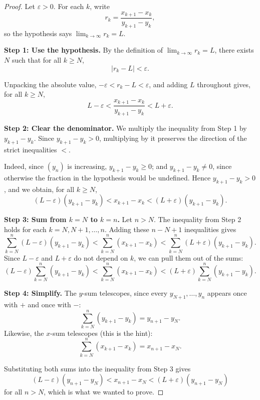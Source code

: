 \documentclass[11pt]{article}
\begin{document}
\begin{proof}


Let $\varepsilon>0$. For each $k$, write
\[
  r_k = \frac{x_{k+1}-x_k}{y_{k+1}-y_k},
\]
so the hypothesis says $\lim_{k\to\infty} r_k = L$.

\textbf{Step 1: Use the hypothesis.}
By the definition of $\lim_{k\to\infty} r_k = L$, there exists $N$ such that
for all $k \ge N$,
\[
  |r_k - L| < \varepsilon .
\]

Unpacking the absolute value, $-\varepsilon < r_k - L < \varepsilon$, and
adding $L$ throughout gives, for all $k\ge N$,
\[
  L - \varepsilon < \frac{x_{k+1}-x_k}{y_{k+1}-y_k} < L + \varepsilon .
\]

\textbf{Step 2: Clear the denominator.}
We multiply the inequality from Step 1 by $y_{k+1}-y_k$. Since
$y_{k+1}-y_k > 0$, multiplying by it preserves the direction of the strict
inequalities $<$.

Indeed, since $(y_n)$ is increasing, $y_{k+1}-y_k \ge 0$; and
$y_{k+1}-y_k \ne 0$, since otherwise the fraction in the hypothesis would be
undefined. Hence $y_{k+1}-y_k>0$, and we obtain, for all $k\ge N$,
\[
  (L-\varepsilon)(y_{k+1}-y_k) < x_{k+1}-x_k < (L+\varepsilon)(y_{k+1}-y_k).
\]

\textbf{Step 3: Sum from $k=N$ to $k=n$.}
Let $n>N$. The inequality from Step 2 holds for each $k=N,N+1,\dots,n$.
Adding these $n-N+1$ inequalities gives
\[
  \sum_{k=N}^{n}(L-\varepsilon)(y_{k+1}-y_k)
  < \sum_{k=N}^{n}(x_{k+1}-x_k)
  < \sum_{k=N}^{n}(L+\varepsilon)(y_{k+1}-y_k).
\]
Since $L-\varepsilon$ and $L+\varepsilon$ do not depend on $k$, we can pull
them out of the sums:
\[
  (L-\varepsilon)\sum_{k=N}^{n}(y_{k+1}-y_k)
  < \sum_{k=N}^{n}(x_{k+1}-x_k)
  < (L+\varepsilon)\sum_{k=N}^{n}(y_{k+1}-y_k).
\]

\textbf{Step 4: Simplify.}
The $y$-sum telescopes, since every $y_{N+1},\dots,y_n$ appears once with $+$
and once with $-$:
\[
  \sum_{k=N}^{n}(y_{k+1}-y_k) = y_{n+1}-y_N .
\]
Likewise, the $x$-sum telescopes (this is the hint):
\[
  \sum_{k=N}^{n}(x_{k+1}-x_k) = x_{n+1}-x_N .
\]

Substituting both sums into the inequality from Step 3 gives
\[
  (L-\varepsilon)(y_{n+1}-y_N) < x_{n+1}-x_N < (L+\varepsilon)(y_{n+1}-y_N)
\]
for all $n>N$, which is what we wanted to prove.

\end{proof}
\end{document}
